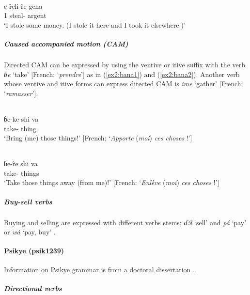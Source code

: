 \ex\label{ex2:bana8}
 \\
\gll e r̂eli-r̂e gena	\\
1 steal- argent	\\
\glt `I stole some money. (I stole it here and I took it elsewhere.)' 
\z 

\subparagraph{Caused accompanied motion (CAM)}

Directed CAM can be expressed by using the ventive or itive suffix with the verb \textit{ɓe} `take' [French: `\textit{prendre}'] as in (\ref{ex2:bana1}) and (\ref{ex2:bana2}). Another verb whose ventive and itive forms can express directed CAM is \textit{ime} `gather' [French: `\textit{ramasser}'].

\ea\label{ex2:bana1}
 \\
\gll ɓe-ke shi va	\\
take- thing 	\\
\glt `Bring (me) those things!' [French: `\textit{Apporte} (\textit{moi}) \textit{ces choses} !']

\ex\label{ex2:bana2}
 \\
\gll ɓe-r̂e shi va	\\
take- things  \\	
\glt `Take those things away (from me)!' [French: `\textit{Enlève} (\textit{moi}) \textit{ces choses} !']
\z 

\subparagraph{Buy-sell verbs}

Buying and selling are expressed with different verbs stems: \textit{ɗə́l} `sell' and \textit{pá} `pay' or \textit{wá} `pay, buy' \citep{gigerBanaProvisionalLexicon2003}.

 \paragraph*{Psikye (psik1239)} \label{psik}

Information on Psikye grammar is from a doctoral dissertation \citep{smithKapsikiLanguage1969}.

\subparagraph{Directional verbs}~

